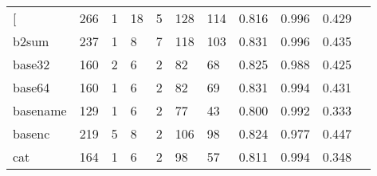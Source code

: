 \begin{longtable}{lp{1.10cm}p{1.10cm}p{1.10cm}p{1.10cm}p{1.10cm}p{1.10cm}p{1.10cm}p{1.10cm}p{1.10cm}p{1.10cm}}
\bottomrule
\endlastfoot
{[}         &                    266 &                                  1 &                                18 &                                5 &                               128 &                             114 &                             0.816 &                                 0.996 &                               0.429 \\
b2sum     &                    237 &                                  1 &                                 8 &                                7 &                               118 &                             103 &                             0.831 &                                 0.996 &                               0.435 \\
base32    &                    160 &                                  2 &                                 6 &                                2 &                                82 &                              68 &                             0.825 &                                 0.988 &                               0.425 \\
base64    &                    160 &                                  1 &                                 6 &                                2 &                                82 &                              69 &                             0.831 &                                 0.994 &                               0.431 \\
basename  &                    129 &                                  1 &                                 6 &                                2 &                                77 &                              43 &                             0.800 &                                 0.992 &                               0.333 \\
basenc    &                    219 &                                  5 &                                 8 &                                2 &                               106 &                              98 &                             0.824 &                                 0.977 &                               0.447 \\
cat       &                    164 &                                  1 &                                 6 &                                2 &                                98 &                              57 &                             0.811 &                                 0.994 &                               0.348 \\

\end{longtable}
